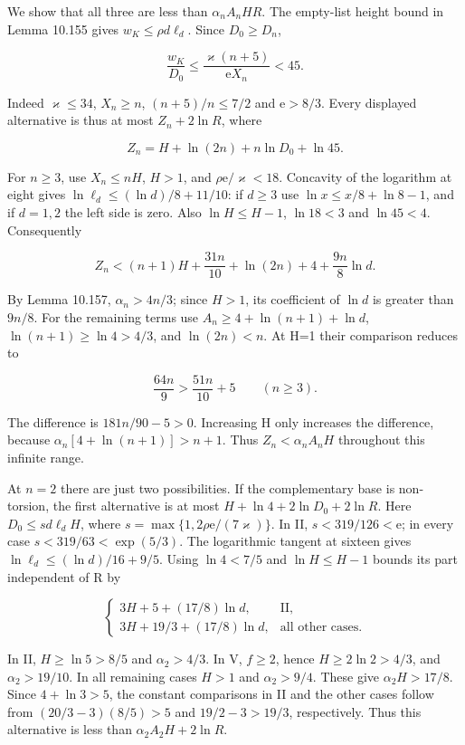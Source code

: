 \documentclass[
  11pt,
  a4paper,
]{article}
\begin{document}
We show that all three are less than \(\alpha_nA_nHR\). The empty-list
height bound in Lemma 10.155 gives \(w_K\le\rho d\ell_d\). Since
\(D_0\ge D_n\),

\[
\frac{w_K}{D_0}\le\frac{\varkappa(n+5)}{\mathrm eX_n}<45.
\tag{10.503}
\]

Indeed \(\varkappa\le34\), \(X_n\ge n\), \((n+5)/n\le7/2\) and
\(\mathrm e>8/3\). Every displayed alternative is thus at most
\(Z_n+2\ln R\), where

\[
Z_n=H+\ln(2n)+n\ln D_0+\ln45.
\tag{10.504}
\]

For \(n\ge3\), use \(X_n\le nH\), \(H>1\), and
\(\rho\mathrm e/\varkappa<18\). Concavity of the logarithm at eight
gives \(\ln\ell_d\le(\ln d)/8+11/10\): if \(d\ge3\) use
\(\ln x\le x/8+\ln8-1\), and if \(d=1,2\) the left side is zero. Also
\(\ln H\le H-1\), \(\ln18<3\) and \(\ln45<4\). Consequently

\[
Z_n<(n+1)H+\frac{31n}{10}+\ln(2n)+4
          +\frac{9n}{8}\ln d.
\tag{10.505}
\]

By Lemma 10.157, \(\alpha_n>4n/3\); since \(H>1\), its coefficient of
\(\ln d\) is greater than \(9n/8\). For the remaining terms use
\(A_n\ge4+\ln(n+1)+\ln d\), \(\ln(n+1)\ge\ln4>4/3\), and \(\ln(2n)<n\).
At H=1 their comparison reduces to

\[
\frac{64n}{9}>\frac{51n}{10}+5\qquad(n\ge3).
\tag{10.506}
\]

The difference is \(181n/90-5>0\). Increasing H only increases the
difference, because \(\alpha_n[4+\ln(n+1)]>n+1\). Thus
\(Z_n<\alpha_nA_nH\) throughout this infinite range.

At \(n=2\) there are just two possibilities. If the complementary base
is non-torsion, the first alternative is at most
\(H+\ln4+2\ln D_0+2\ln R\). Here \(D_0\le s d\ell_dH\), where
\(s=\max\{1,2\rho\mathrm e/(7\varkappa)\}\). In II,
\(s<319/126<\mathrm e\); in every case \(s<319/63<\exp(5/3)\). The
logarithmic tangent at sixteen gives \(\ln\ell_d\le(\ln d)/16+9/5\).
Using \(\ln4<7/5\) and \(\ln H\le H-1\) bounds its part independent of R
by

\[
\begin{cases}
3H+5+(17/8)\ln d,&\mathrm{II},\\
3H+19/3+(17/8)\ln d,&\text{all other cases}.
\end{cases}
\tag{10.507}
\]

In II, \(H\ge\ln5>8/5\) and \(\alpha_2>4/3\). In V, \(f\ge2\), hence
\(H\ge2\ln2>4/3\), and \(\alpha_2>19/10\). In all remaining cases
\(H>1\) and \(\alpha_2>9/4\). These give \(\alpha_2H>17/8\). Since
\(4+\ln3>5\), the constant comparisons in II and the other cases follow
from \((20/3-3)(8/5)>5\) and \(19/2-3>19/3\), respectively. Thus this
alternative is less than \(\alpha_2A_2H+2\ln R\).
\end{document}
